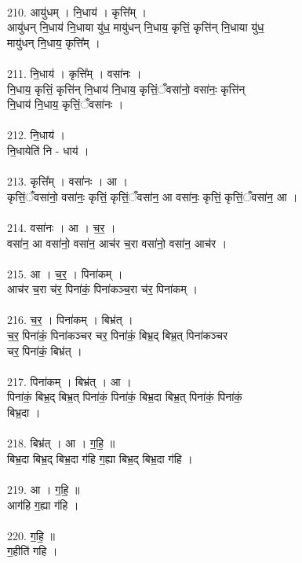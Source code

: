 \\
210. आयु॑धम् । नि॒धाय॑ । कृत्ति᳚म् ।\\
आयु॑धन् नि॒धाय॑ नि॒धाया यु॑ध॒ मायु॑धन् नि॒धाय॒ कृत्तिं॒ कृत्ति॑न् नि॒धाया यु॑ध॒\\
मायु॑धन् नि॒धाय॒ कृत्ति᳚म् ।\\
\\
211. नि॒धाय॑ । कृत्ति᳚म् । वसा॑नः ।\\
नि॒धाय॒ कृत्तिं॒ कृत्ति॑न् नि॒धाय॑ नि॒धाय॒ कृत्तिं॒ँवसा॑नो॒ वसा॑नः॒ कृत्ति॑न्\\
नि॒धाय॑ नि॒धाय॒ कृत्तिं॒ँवसा॑नः ।\\
\\
212. नि॒धाय॑ ।\\
नि॒धायेति॑ नि - धाय॑ ।\\
\\
213. कृत्ति᳚म् । वसा॑नः । आ ।\\
कृत्तिं॒ँवसा॑नो॒ वसा॑नः॒ कृत्तिं॒ कृत्तिं॒ँवसा॑न॒ आ वसा॑नः॒ कृत्तिं॒ कृत्तिं॒ँवसा॑न॒ आ ।\\
\\
214. वसा॑नः । आ । च॒र॒ ।\\
वसा॑न॒ आ वसा॑नो॒ वसा॑न॒ आच॑र च॒रा वसा॑नो॒ वसा॑न॒ आच॑र ।\\
\\
215. आ । च॒र॒ । पिना॑कम् ।\\
आच॑र च॒रा च॑र॒ पिना॑कं॒ पिना॑कञ्च॒रा च॑र॒ पिना॑कम् ।\\
\\
216. च॒र॒ । पिना॑कम् । बिभ्र॑त् ।\\
च॒र॒ पिना॑कं॒ पिना॑कञ्चर चर॒ पिना॑कं॒ बिभ्र॒द् बिभ्र॒त् पिना॑कञ्चर\\
चर॒ पिना॑कं॒ बिभ्र॑त् ।\\
\\
217. पिना॑कम् । बिभ्र॑त् । आ ।\\
पिना॑कं॒ बिभ्र॒द् बिभ्र॒त् पिना॑कं॒ पिना॑कं॒ बिभ्र॒दा बिभ्र॒त् पिना॑कं॒ पिना॑कं॒\\
बिभ्र॒दा ।\\
\\
218. बिभ्र॑त् । आ । ग॒हि॒ ॥\\
बिभ्र॒दा बिभ्र॒द् बिभ्र॒दा ग॑हि ग॒ह्या बिभ्र॒द् बिभ्र॒दा ग॑हि ।\\
\\
219. आ । ग॒हि॒ ॥\\
आग॑हि ग॒ह्या ग॑हि ।\\
\\
220. ग॒हि॒  ॥\\
ग॒हीति॑ गहि ।\\
\\
